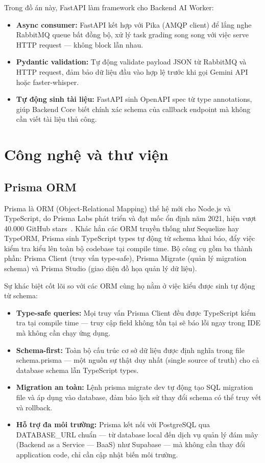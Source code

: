Trong đồ án này, FastAPI làm framework cho Backend AI Worker:

\begin{itemize}
    \item \textbf{Async consumer:} FastAPI kết hợp với Pika (AMQP client) để lắng nghe RabbitMQ queue bất đồng bộ, xử lý task grading song song với việc serve HTTP request --- không block lẫn nhau.
    \item \textbf{Pydantic validation:} Tự động validate payload JSON từ RabbitMQ và HTTP request, đảm bảo dữ liệu đầu vào hợp lệ trước khi gọi Gemini API hoặc faster-whisper.
    \item \textbf{Tự động sinh tài liệu:} FastAPI sinh OpenAPI spec từ type annotations, giúp Backend Core biết chính xác schema của callback endpoint mà không cần viết tài liệu thủ công.
\end{itemize}

\section{Công nghệ và thư viện}

\subsection{Prisma ORM}

Prisma là ORM (Object-Relational Mapping) thế hệ mới cho Node.js và TypeScript, do Prisma Labs phát triển và đạt mốc ổn định năm 2021, hiện vượt 40.000 GitHub stars~\cite{prisma-docs}. Khác hẳn các ORM truyền thống như Sequelize hay TypeORM, Prisma sinh TypeScript types tự động từ schema khai báo, đẩy việc kiểm tra kiểu lên toàn bộ codebase tại compile time. Bộ công cụ gồm ba thành phần: Prisma Client (truy vấn type-safe), Prisma Migrate (quản lý migration schema) và Prisma Studio (giao diện đồ họa quản lý dữ liệu).

Sự khác biệt cốt lõi so với các ORM cùng họ nằm ở việc kiểu được sinh tự động từ schema:

\begin{itemize}
    \item \textbf{Type-safe queries:} Mọi truy vấn Prisma Client đều được TypeScript kiểm tra tại compile time --- truy cập field không tồn tại sẽ báo lỗi ngay trong IDE mà không cần chạy ứng dụng.
    \item \textbf{Schema-first:} Toàn bộ cấu trúc cơ sở dữ liệu được định nghĩa trong file schema.prisma --- một nguồn sự thật duy nhất (single source of truth) cho cả database schema lẫn TypeScript types.
    \item \textbf{Migration an toàn:} Lệnh prisma migrate dev tự động tạo SQL migration file và áp dụng vào database, đảm bảo lịch sử thay đổi schema có thể truy vết và rollback.
    \item \textbf{Hỗ trợ đa môi trường:} Prisma kết nối với PostgreSQL qua DATABASE\_URL chuẩn --- từ database local đến dịch vụ quản lý đám mây (Backend as a Service --- BaaS) như Supabase --- mà không cần thay đổi application code, chỉ cần cập nhật biến môi trường.
\end{itemize}

